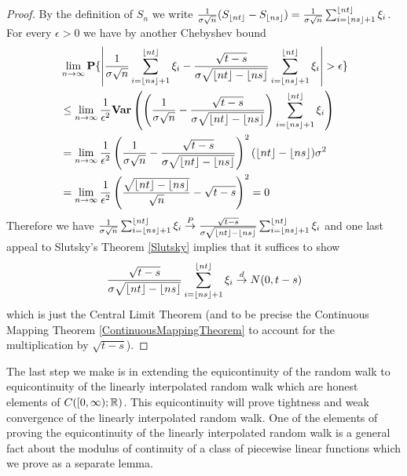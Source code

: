 \begin{proof}
By the definition of $S_n$ we write $\frac{1}{\sigma\sqrt{n}}
(S_{\lfloor nt \rfloor}-S_{\lfloor ns \rfloor}) =
\frac{1}{\sigma\sqrt{n}}\sum_{i=\lfloor ns \rfloor+1}^{\lfloor nt \rfloor}
\xi_i$.  For every $\epsilon > 0$ we have by another Chebyshev bound 
\begin{align*}
&\lim_{n \to \infty} \textbf{P}\{\left \vert \frac{1}{\sigma\sqrt{n}}
\sum_{i=\lfloor ns \rfloor+1}^{\lfloor nt \rfloor}\xi_i
- \frac{\sqrt{t-s}}{\sigma\sqrt{\lfloor nt \rfloor-\lfloor ns \rfloor}}
\sum_{i=\lfloor ns \rfloor+1}^{\lfloor nt \rfloor}\xi_i  \right \vert > \epsilon\} \\
&\leq \lim_{n \to \infty}\frac{1}{\epsilon^2}\textbf{Var} \left (\left(\frac{1}{\sigma\sqrt{n}}
-\frac{\sqrt{t-s}}{\sigma\sqrt{\lfloor nt \rfloor-\lfloor ns \rfloor}} \right)
\sum_{i=\lfloor ns \rfloor+1}^{\lfloor nt \rfloor}\xi_i \right ) \\
&= \lim_{n \to \infty}\frac{1}{\epsilon^2}\left(\frac{1}{\sigma\sqrt{n}}
-\frac{\sqrt{t-s}}{\sigma\sqrt{\lfloor nt \rfloor-\lfloor ns \rfloor}} \right)^2
(\lfloor nt \rfloor-\lfloor ns \rfloor) \sigma^2\\
&= \lim_{n \to \infty} \frac{1}{\epsilon^2} \left(
  \frac{\sqrt{\lfloor nt \rfloor-\lfloor ns \rfloor}}{\sqrt{n}} -
  \sqrt{t-s}\right)^2 = 0
\end{align*}
Therefore we have $\frac{1}{\sigma\sqrt{n}}
\sum_{i=\lfloor ns \rfloor+1}^{\lfloor nt \rfloor}\xi_i \overset{P}\to \frac{\sqrt{t-s}}{\sigma\sqrt{\lfloor nt \rfloor-\lfloor ns \rfloor}}
\sum_{i=\lfloor ns \rfloor+1}^{\lfloor nt \rfloor}\xi_i $ and one last appeal to
Slutsky's Theorem \ref{Slutsky} implies that it suffices to show
\begin{align*}
\frac{\sqrt{t-s}}{\sigma\sqrt{\lfloor nt \rfloor-\lfloor ns \rfloor}}
\sum_{i=\lfloor ns \rfloor+1}^{\lfloor nt \rfloor}\xi_i \overset{d}\to N(0, t-s)
\end{align*}
which is just the Central Limit Theorem (and to be precise the
Continuous Mapping Theorem \ref{ContinuousMappingTheorem} to account for the multiplication by $\sqrt{t-s}$).
\end{proof}

The last step we make is in extending the equicontinuity of the random
walk to equicontinuity of the linearly interpolated random walk which
are honest elements of $C([0, \infty); \mathbb{R})$.  This equicontinuity
will prove tightness and weak convergence of the linearly interpolated
random walk.  One of the elements of proving the equicontinuity of the
linearly interpolated random walk is a general fact about the modulus
of continuity of a class of piecewise linear functions which we prove
as a separate lemma.

